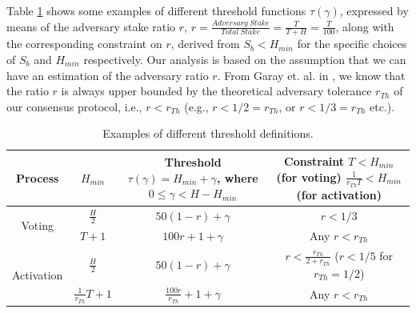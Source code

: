 Table \ref{table:threshold_examples} shows some examples of different 
threshold functions $\tau(\gamma)$, expressed by means of 
the adversary stake ratio $r$, $r = \frac{Adversary\ Stake}{Total\ Stake} = 
\frac{T}{T+H} = \frac{T}{100}$, along with the corresponding constraint on $r$, 
derived from $S_b < H_{min}$ for the specific choices of $S_b$ and $H_{min}$ 
respectively. Our analysis is based on the assumption 
that we can have an estimation of the adversary ratio $r$. From Garay et. al. 
in \cite{sok}, we know that the 
ratio $r$ is always upper bounded by the 
theoretical 
adversary tolerance $r_{Th}$ of our consensus protocol, i.e., $r < r_{Th}$ 
(e.g., $r < 1/2 = 
r_{Th}$, or $r < 1/3 = r_{Th}$ etc.).

\begin{table}[h!]
	\centering
	\begin{tabular}{ | c | c | c | c |} 
		\hline
		\textbf{Process} & $H_{min}$ & \makecell[c]{Threshold\\ $\tau(\gamma) = 
		H_{min} + \gamma$,\\ where $0 \leq \gamma < H-H_{min}$} & 
		\makecell[c]{Constraint\\$T < H_{min}$ (for voting)\\ 
		$\frac{1}{r_{Th}T} < H_{min}$ 
		(for activation)} \\ 
		\hline
		\multirow{2}{*}{Voting} & $\frac{H}{2}$ & 
		$50(1-r)+\gamma$ & $r < 1/3$
		 \\ 
		 & $T+1$ & $100r + 1 +\gamma$ & Any $r < r_{Th}$ \\ 
		\hline
		\multirow{2}{*}{Activation} & $\frac{H}{2}$ & 
		$50(1-r)+\gamma$ & 
		\makecell[c]{$r < \frac{r_{Th}}{2+r_{Th}}$ \\ ($r < 1/5$ for 
		$r_{Th} = 1/2$)}
		\\ 
		 & $\frac{1}{r_{Th}}T + 1$ & 
		$\frac{100r}{r_{Th}} + 1 + \gamma$ & Any $r < r_{Th}$ \\ 
		\hline
	\end{tabular}
	\caption{Examples of different threshold definitions.}
	\label{table:threshold_examples}
\end{table}

